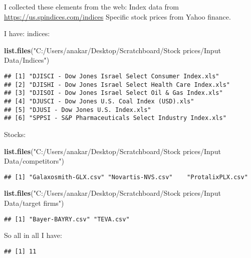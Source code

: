 \documentclass[
]{article}
\newenvironment{Shaded}{\begin{snugshade}}{\end{snugshade}}
\newcommand{\KeywordTok}[1]{\textcolor[rgb]{0.13,0.29,0.53}{\textbf{#1}}}
\newcommand{\NormalTok}[1]{#1}
\newcommand{\StringTok}[1]{\textcolor[rgb]{0.31,0.60,0.02}{#1}}
\begin{document}
I collected these elements from the web: Index data from
\url{https://us.spindices.com/indices} Specific stock prices from Yahoo
finance.

I have: indices:

\begin{Shaded}
\begin{Highlighting}[]
\KeywordTok{list.files}\NormalTok{(}\StringTok{"C:/Users/anakar/Desktop/Scratchboard/Stock prices/Input Data/Indices"}\NormalTok{)}
\end{Highlighting}
\end{Shaded}

\begin{verbatim}
## [1] "DJISCI - Dow Jones Israel Select Consumer Index.xls"   
## [2] "DJISHI - Dow Jones Israel Select Health Care Index.xls"
## [3] "DJISOI - Dow Jones Israel Select Oil & Gas Index.xls"  
## [4] "DJUSCI - Dow Jones U.S. Coal Index (USD).xls"          
## [5] "DJUSI - Dow Jones U.S. Index.xls"                      
## [6] "SPPSI - S&P Pharmaceuticals Select Industry Index.xls"
\end{verbatim}

Stocks:

\begin{Shaded}
\begin{Highlighting}[]
\KeywordTok{list.files}\NormalTok{(}\StringTok{"C:/Users/anakar/Desktop/Scratchboard/Stock prices/Input Data/competitors"}\NormalTok{)}
\end{Highlighting}
\end{Shaded}

\begin{verbatim}
## [1] "Galaxosmith-GLX.csv" "Novartis-NVS.csv"    "ProtalixPLX.csv"
\end{verbatim}

\begin{Shaded}
\begin{Highlighting}[]
\KeywordTok{list.files}\NormalTok{(}\StringTok{"C:/Users/anakar/Desktop/Scratchboard/Stock prices/Input Data/target firms"}\NormalTok{)}
\end{Highlighting}
\end{Shaded}

\begin{verbatim}
## [1] "Bayer-BAYRY.csv" "TEVA.csv"
\end{verbatim}

So all in all I have:

\begin{verbatim}
## [1] 11
\end{verbatim}
\end{document}
